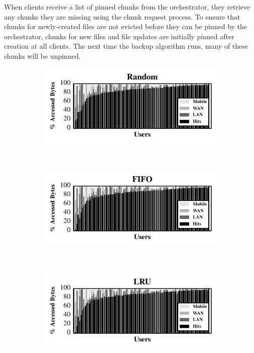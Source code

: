 When clients receive a list of pinned chunks from the orchestrator, they
retrieve any chunks they are missing using the chunk request process.
To ensure that chunks for newly-created files are not
evicted before they can be pinned by the orchestrator, chunks for new files
and file updates are initially pinned after creation at all clients. The next
time the backup algorithm runs, many of these chunks will be unpinned.
\begin{figure}[t]

  \begin{subfigure}[b]{0.95\columnwidth}

    \includegraphics[width=\columnwidth]{./figures/pocketlocker/RandomSimulatorPerformanceGraph.pdf}

  \end{subfigure}\\
  \begin{subfigure}[b]{0.95\columnwidth}

    \includegraphics[width=\columnwidth]{./figures/pocketlocker/FIFOSimulatorPerformanceGraph.pdf}

  \end{subfigure}\\
  \begin{subfigure}[t]{0.95\columnwidth}

    \includegraphics[width=\columnwidth]{./figures/pocketlocker/LRUSimulatorPerformanceGraph.pdf}


\end{subfigure}
\end{figure}
